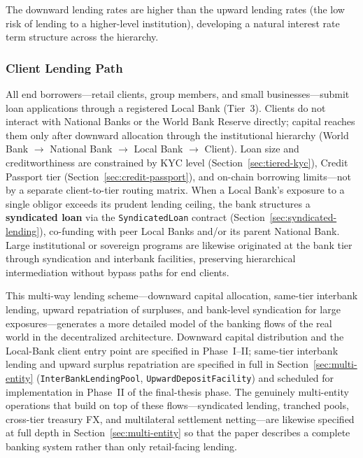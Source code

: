 \documentclass[12pt,a4paper]{report}
\begin{document}
The downward lending rates are higher than the upward lending rates (the low risk of lending to a higher-level institution), developing a natural interest rate term structure across the hierarchy.

\subsubsection{Client Lending Path}

All end borrowers---retail clients, group members, and small businesses---submit loan applications through a registered Local Bank (Tier~3). Clients do not interact with National Banks or the World Bank Reserve directly; capital reaches them only after downward allocation through the institutional hierarchy (World Bank $\to$ National Bank $\to$ Local Bank $\to$ Client). Loan size and creditworthiness are constrained by KYC level (Section~\ref{sec:tiered-kyc}), Credit Passport tier (Section~\ref{sec:credit-passport}), and on-chain borrowing limits---not by a separate client-to-tier routing matrix. When a Local Bank's exposure to a single obligor exceeds its prudent lending ceiling, the bank structures a \textbf{syndicated loan} via the \texttt{SyndicatedLoan} contract (Section~\ref{sec:syndicated-lending}), co-funding with peer Local Banks and/or its parent National Bank. Large institutional or sovereign programs are likewise originated at the bank tier through syndication and interbank facilities, preserving hierarchical intermediation without bypass paths for end clients.

This multi-way lending scheme---downward capital allocation, same-tier interbank lending, upward repatriation of surpluses, and bank-level syndication for large exposures---generates a more detailed model of the banking flows of the real world in the decentralized architecture. Downward capital distribution and the Local-Bank client entry point are specified in Phase~I--II; same-tier interbank lending and upward surplus repatriation are specified in full in Section~\ref{sec:multi-entity} (\texttt{InterBankLendingPool}, \texttt{UpwardDepositFacility}) and scheduled for implementation in Phase~II of the final-thesis phase. The genuinely multi-entity operations that build on top of these flows---syndicated lending, tranched pools, cross-tier treasury FX, and multilateral settlement netting---are likewise specified at full depth in Section~\ref{sec:multi-entity} so that the paper describes a complete banking system rather than only retail-facing lending.
\end{document}
